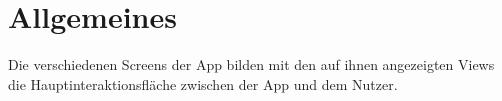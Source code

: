 \section{Allgemeines}

Die verschiedenen Screens der App bilden mit den auf ihnen angezeigten Views die 
Hauptinteraktionsfläche zwischen der App und dem Nutzer.